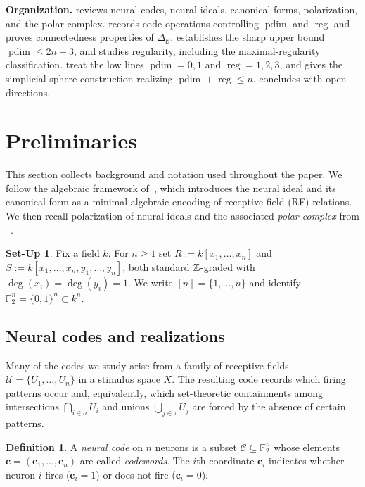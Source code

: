 \documentclass[12pt]{amsart}
\theoremstyle{remark}
\theoremstyle{definition}
\newtheorem{definition}[theorem]{Definition}
\newtheorem{setup}[theorem]{Set-Up}
\DeclareMathOperator{\reg}{reg}
\DeclareMathOperator{\pd}{pdim}
\newcommand{\F}{\mathbb{F}}
\newcommand{\cw}{\mathbf{c}}
\newcommand{\C}{\mathcal{C}}
\newcommand{\U}{\mathcal{U}}
\begin{document}
\textbf{Organization.}
 reviews neural codes, neural ideals, canonical forms, polarization, and
the polar complex.   records code operations controlling $\pd$ and $\reg$ and  proves
connectedness properties of $\Delta_\C$.   establishes the sharp upper bound
$\pd\le 2n-3$, and  studies regularity, including the maximal-regularity
classification.   treat the low lines $\pd=0,1$ and $\reg=1,2,3$,
and  gives the simplicial-sphere construction realizing $\pd+\reg\le n$.
 concludes with open directions.





\section{Preliminaries}\label{sect:neural-codes-intro}

This section collects background and notation used throughout the paper. We follow the algebraic
framework of~\cite{smb}, which introduces the neural ideal and its canonical form as a minimal
algebraic encoding of receptive-field (RF) relations. We then recall polarization of neural ideals
and the associated \emph{polar complex} from ~\cite{gjs}.

\begin{setup}\label{setup:prelim}
Fix a field $k$. For $n\ge 1$ set $R:=k[x_1,\dots,x_n]$ and
$S:=k[x_1,\dots,x_n,y_1,\dots,y_n]$, both standard $\Bbb Z$-graded with
$\deg(x_i)=\deg(y_i)=1$. We write $[n]=\{1,\dots,n\}$ and identify $\F_2^n=\{0,1\}^n\subset k^n$.
\end{setup}

\subsection{Neural codes and realizations}

Many of the codes we study arise from a family of receptive fields $\U=\{U_1,\dots,U_n\}$ in a
stimulus space $X$.  The resulting code records which firing patterns occur and, equivalently, which
set-theoretic containments among intersections $\bigcap_{i\in\sigma}U_i$ and unions $\bigcup_{j\in\tau}U_j$
are forced by the absence of certain patterns.


\begin{definition}
A \emph{neural code} on $n$ neurons is a subset $\C\subseteq \F_2^n$ whose elements
$\cw=(\cw_1,\dots,\cw_n)$ are called \emph{codewords}. The $i$th coordinate $\cw_i$ indicates
whether neuron $i$ fires ($\cw_i=1$) or does not fire ($\cw_i=0$).
\end{definition}
\end{document}
